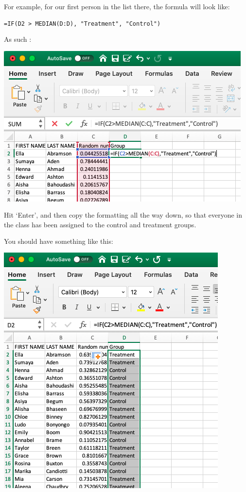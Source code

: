 \documentclass[
]{book}
\begin{document}
For example, for our first person in the list there, the formula will look like:

\texttt{=IF(D2\ \textgreater{}\ MEDIAN(D:D),\ "Treatment",\ "Control")}

As such :

\includegraphics{imgs/first_rand_assig.png}

Hit `Enter', and then copy the formatting all the way down, so that everyone in the class has been assigned to the control and treatment groups.

You should have something like this:

\includegraphics{imgs/students_assigned.png}
\end{document}
